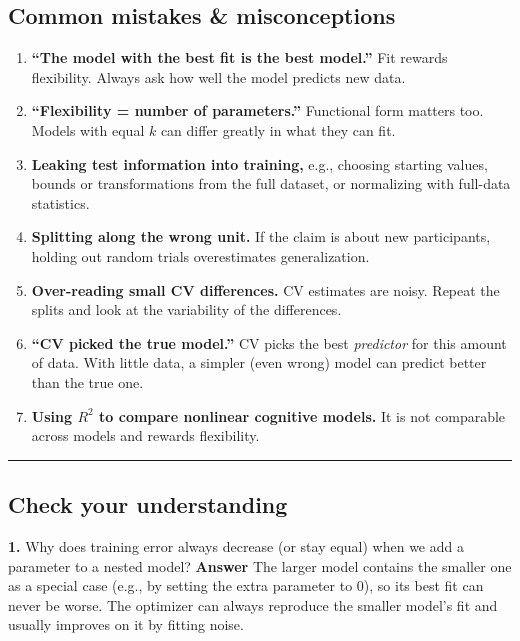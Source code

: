 \subsection{Common mistakes \& misconceptions}

\begin{enumerate}
\def\labelenumi{\arabic{enumi}.}
\tightlist
\item
  \textbf{``The model with the best fit is the best model.''} Fit
  rewards flexibility. Always ask how well the model predicts new data.
\item
  \textbf{``Flexibility = number of parameters.''} Functional form
  matters too. Models with equal \(k\) can differ greatly in what they
  can fit.
\item
  \textbf{Leaking test information into training,} e.g., choosing
  starting values, bounds or transformations from the full dataset, or
  normalizing with full-data statistics.
\item
  \textbf{Splitting along the wrong unit.} If the claim is about new
  participants, holding out random trials overestimates generalization.
\item
  \textbf{Over-reading small CV differences.} CV estimates are noisy.
  Repeat the splits and look at the variability of the differences.
\item
  \textbf{``CV picked the true model.''} CV picks the best
  \emph{predictor} for this amount of data. With little data, a simpler
  (even wrong) model can predict better than the true one.
\item
  \textbf{Using \(R^2\) to compare nonlinear cognitive models.} It is
  not comparable across models and rewards flexibility.
\end{enumerate}

\begin{center}\rule{0.5\linewidth}{0.5pt}\end{center}

\subsection{Check your understanding}

\textbf{1.} Why does training error always decrease (or stay equal) when
we add a parameter to a nested model? \textbf{Answer} The larger model
contains the smaller one as a special case (e.g., by setting the extra
parameter to 0), so its best fit can never be worse. The optimizer can
always reproduce the smaller model's fit and usually improves on it by
fitting noise.

